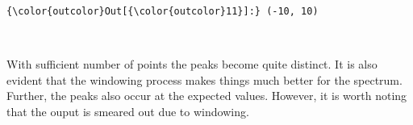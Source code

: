 \documentclass[a4paper, 12pt, margin= 1.25cm]{article}
\begin{document}
\begin{Verbatim}[commandchars=\\\{\}]
{\color{outcolor}Out[{\color{outcolor}11}]:} (-10, 10)
\end{Verbatim}
            
    \begin{center}
    \end{center}
    { \hspace*{\fill} \\}
    
    With sufficient number of points the peaks become quite distinct. It is
also evident that the windowing process makes things much better for the
spectrum. Further, the peaks also occur at the expected values. However,
it is worth noting that the ouput is smeared out due to windowing.
\end{document}
